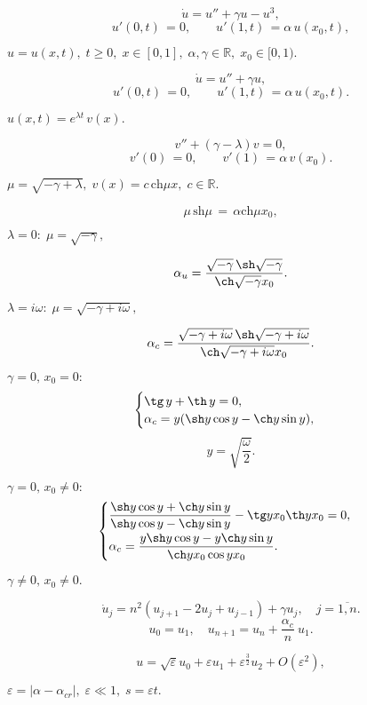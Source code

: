 \documentclass[12pt]{extarticle}
\begin{document}
$$ \dot u = u'' + \gamma u - u^3, $$
$$ u'(0, t) \, = 0, \qquad u'(1, t) \, = \alpha\,u(x_0, t), $$

$ u = u(x, t), \; t \geqslant 0, \; x \in [0, 1], \; \alpha, \gamma \in \mathbb{R}, \; x_0 \in [0, 1). $

$$ \dot u = u'' + \gamma u,	$$
$$ u'(0, t) \, = 0, \qquad u'(1, t) \, = \alpha\,u(x_0, t). $$

$ u(x, t) = e^{\lambda t} \, v(x). $

$$ v'' + (\gamma - \lambda)v = 0, $$	
$$ v'(0) \, = 0, \qquad v'(1) \, = \alpha\,v(x_0). $$

$ \mu = \sqrt{-\gamma + \lambda}, \; v(x) = c \, \mbox{ch}  \mu x, \; c \in \mathbb{R}. $

$$ \mu \, \mbox{sh} \mu \, = \, \alpha \mbox{ch} \mu x_0 , $$

$ \lambda = 0: \; \mu = \sqrt{-\gamma}, $

$$ \alpha_u = \frac{ \sqrt{-\gamma} \, \sh \sqrt{-\gamma} }{ \ch \sqrt{-\gamma} x_0 }. $$

$ \lambda = i \omega: \; \mu = \sqrt{-\gamma + i \omega}, $ 

$$ \alpha_c = \frac{ \sqrt{-\gamma + i \omega} \, \sh \sqrt{-\gamma + i \omega} }{ \ch \sqrt{-\gamma + i \omega} x_0 }. $$

$ \gamma = 0, \, x_0 = 0: $ 
$$
 \begin{cases}
   \tg \, y + \th \, y = 0, 
   \\
   \alpha_c = y(\sh y \cos y - \ch y \sin y),
 \end{cases}
$$
$$ y = \sqrt{ \frac{\omega}{2} }. $$

$ \gamma = 0, \, x_0 \neq 0: $ 
$$
 \begin{cases}
   \dfrac{\sh y \cos y + \ch y \sin y}{\sh y \cos y - \ch y \sin y} - \tg y x_0 \th y x_0 = 0, 
   \vspace{0.1cm}
   \\ 
   \alpha_c = \dfrac{y \sh y \cos y - y \ch y \sin y}{\ch y x_0 \cos y x_0}.
 \end{cases}
$$

$ \gamma \neq 0, \, x_0 \neq 0. $ 

$$ \dot{u}_j =  n^2(u_{j+1} - 2u_j + u_{j-1}) + \gamma u_j, \quad j = \overline{1, n}. $$
$$ u_0 = u_1, \quad u_{n+1} = u_n + \frac{\alpha_c}{n}\:u_1. $$

$$ u = \sqrt{\varepsilon}u_0 + \varepsilon u_1 + \varepsilon^{\frac{3}{2}} u_2 + O(\varepsilon^2), $$

$ \varepsilon = | \alpha - \alpha_{cr} |, \; \varepsilon \ll 1, \; s = \varepsilon t. $
\end{document}
